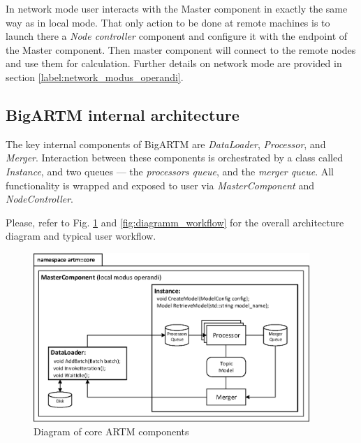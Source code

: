 \documentclass[11pt,a4paper,twoside]{report}
\begin{document}
In network mode user interacts with the Master component in exactly the same way
as in local mode.
That only action to be done at remote machines is to launch
there a \emph{Node controller} component
and configure it with the endpoint of the Master component.
Then master component will connect to the remote nodes and use them for calculation.
Further details on network mode are provided in section \ref{label:network_modus_operandi}.

\subsection{BigARTM internal architecture}

The key internal components of BigARTM are \emph{DataLoader}, \emph{Processor}, and \emph{Merger}.
Interaction between these components is orchestrated by a class called \emph{Instance},
and two queues --- the \emph{processors queue}, and the \emph{merger queue}.
All functionality is wrapped and exposed to user via \emph{MasterComponent} and \emph{NodeController}.

Please, refer to Fig. \ref{fig:diagramm_artm_core} and \ref{fig:diagramm_workflow}
for the overall architecture diagram and typical user workflow.

\begin{figure}[h!]
\begin{centering}
\includegraphics[height=64mm]{diagramm_artm_core.eps}
\caption{Diagram of core ARTM components}
\label{fig:diagramm_artm_core}
\end{centering}
\end{figure}
\vspace{1ex}
\end{document}
